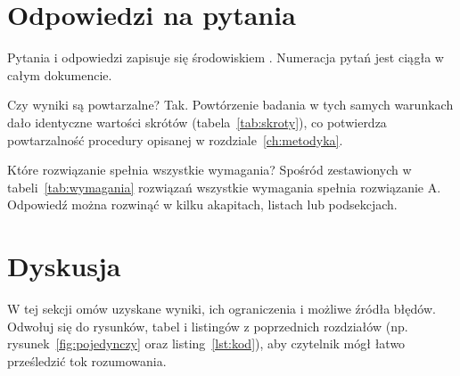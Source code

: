 \section{Odpowiedzi na pytania}\label{sec:pytania}

Pytania i odpowiedzi zapisuje się środowiskiem . Numeracja pytań jest ciągła w całym dokumencie.

\begin{qa}{Czy wyniki są powtarzalne?}
    Tak. Powtórzenie badania w tych samych warunkach dało identyczne wartości skrótów (tabela~\ref{tab:skroty}),
    co potwierdza powtarzalność procedury opisanej w rozdziale~\ref{ch:metodyka}.
\end{qa}

\begin{qa}{Które rozwiązanie spełnia wszystkie wymagania?}
    Spośród zestawionych w tabeli~\ref{tab:wymagania} rozwiązań wszystkie wymagania spełnia rozwiązanie A.
    Odpowiedź można rozwinąć w kilku akapitach, listach lub podsekcjach.
\end{qa}

\section{Dyskusja}\label{sec:dyskusja}

W tej sekcji omów uzyskane wyniki, ich ograniczenia i możliwe źródła błędów. Odwołuj się do rysunków,
tabel i listingów z poprzednich rozdziałów (np. rysunek~\ref{fig:pojedynczy} oraz listing~\ref{lst:kod}),
aby czytelnik mógł łatwo prześledzić tok rozumowania.
